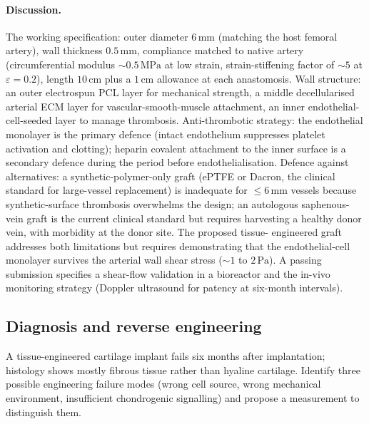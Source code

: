 \paragraph{Discussion.} The working specification: outer diameter
$6\,\text{mm}$ (matching the host femoral artery), wall thickness
$0.5\,\text{mm}$, compliance matched to native artery
(circumferential modulus $\sim 0.5\,\text{MPa}$ at low strain,
strain-stiffening factor of $\sim 5$ at $\varepsilon = 0.2$),
length $10\,\text{cm}$ plus a $1\,\text{cm}$ allowance at each
anastomosis. Wall structure: an outer electrospun PCL layer for
mechanical strength, a middle decellularised arterial ECM layer
for vascular-smooth-muscle attachment, an inner endothelial-
cell-seeded layer to manage thrombosis. Anti-thrombotic strategy:
the endothelial monolayer is the primary defence (intact
endothelium suppresses platelet activation and clotting); heparin
covalent attachment to the inner surface is a secondary defence
during the period before endothelialisation. Defence against
alternatives: a synthetic-polymer-only graft (ePTFE or Dacron, the
clinical standard for large-vessel replacement) is inadequate for
$\le 6\,\text{mm}$ vessels because synthetic-surface thrombosis
overwhelms the design; an autologous saphenous-vein graft is the
current clinical standard but requires harvesting a healthy donor
vein, with morbidity at the donor site. The proposed tissue-
engineered graft addresses both limitations but requires
demonstrating that the endothelial-cell monolayer survives the
arterial wall shear stress ($\sim 1$ to $2\,\text{Pa}$). A passing
submission specifies a shear-flow validation in a bioreactor and
the in-vivo monitoring strategy (Doppler ultrasound for patency at
six-month intervals).

\subsection*{Diagnosis and reverse engineering}

\begin{exercise}
A tissue-engineered cartilage implant fails six months after
implantation; histology shows mostly fibrous tissue rather than
hyaline cartilage. Identify three possible engineering failure modes
(wrong cell source, wrong mechanical environment, insufficient
chondrogenic signalling) and propose a measurement to distinguish
them.
\end{exercise}

